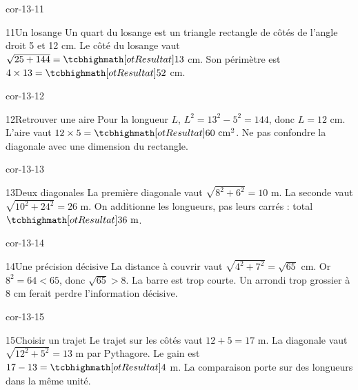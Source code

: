 \begin{blocLivre}{cor-13-11}\begin{corrige}{11}{Un losange}
Un quart du losange est un triangle rectangle de côtés de l’angle droit 5 et 12 cm. Le côté du losange vaut $\sqrt{25+144}=\res{13}$ cm. Son périmètre est $4\times13=\res{52}$ cm.
\label{fig-cor-13-11}
\end{corrige}\end{blocLivre}
\begin{blocLivre}{cor-13-12}\begin{corrige}{12}{Retrouver une aire}
Pour la longueur $L$, $L^2=13^2-5^2=144$, donc $L=12$ cm. L’aire vaut $12\times5=\res{60\ \mathrm{cm}^2}$. Ne pas confondre la diagonale avec une dimension du rectangle.
\label{fig-cor-13-12}
\end{corrige}\end{blocLivre}
\begin{blocLivre}{cor-13-13}\begin{corrige}{13}{Deux diagonales}
La première diagonale vaut $\sqrt{8^2+6^2}=10$ m. La seconde vaut $\sqrt{10^2+24^2}=26$ m. On additionne les longueurs, pas leurs carrés : total $\res{36\ \mathrm m}$.
\label{fig-cor-13-13}
\end{corrige}\end{blocLivre}
\begin{blocLivre}{cor-13-14}\begin{corrige}{14}{Une précision décisive}
La distance à couvrir vaut $\sqrt{4^2+7^2}=\sqrt{65}$ cm. Or $8^2=64<65$, donc $\sqrt{65}>8$. La barre est trop courte. Un arrondi trop grossier à 8 cm ferait perdre l’information décisive.
\label{fig-cor-13-14}
\end{corrige}\end{blocLivre}
\begin{blocLivre}{cor-13-15}\begin{corrige}{15}{Choisir un trajet}
Le trajet sur les côtés vaut $12+5=17$ m. La diagonale vaut $\sqrt{12^2+5^2}=13$ m par Pythagore. Le gain est $17-13=\res4$ m. La comparaison porte sur des longueurs dans la même unité.
\label{fig-cor-13-15}
\end{corrige}\end{blocLivre}
